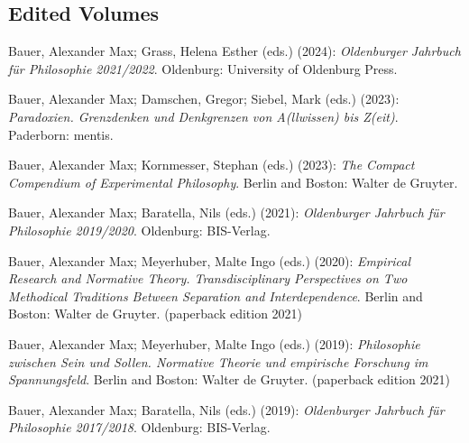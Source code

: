 \documentclass[a4paper,10pt]{article}
\newenvironment{literature}{%
   \parskip6pt\parindent0pt\raggedright
   \def\lititem{\hangindent=1cm\hangafter1}}{%
   \par\ignorespaces}
\begin{document}
\subsection*{Edited Volumes}
\begin{literature}
\lititem Bauer, Alexander Max; Grass, Helena Esther (eds.) (2024): \textit{Oldenburger Jahrbuch für Philosophie 2021/2022}. Oldenburg: University of Oldenburg Press.

\lititem Bauer, Alexander Max; Damschen, Gregor; Siebel, Mark (eds.) (2023): \textit{Paradoxien. Grenzdenken und Denkgrenzen von A(llwissen) bis Z(eit)}. Paderborn: mentis.

\lititem Bauer, Alexander Max; Kornmesser, Stephan (eds.) (2023): \textit{The Compact Compendium of Experimental Philosophy}. Berlin and Boston: Walter de Gruyter.

\lititem Bauer, Alexander Max; Baratella, Nils (eds.) (2021): \textit{Oldenburger Jahrbuch für Philosophie 2019/2020}. Oldenburg: BIS-Verlag.

\lititem Bauer, Alexander Max; Meyerhuber, Malte Ingo (eds.) (2020): \textit{Empirical Research and Normative Theory. Transdisciplinary Perspectives on Two Methodical Traditions Between Separation and Interdependence}. Berlin and Boston: Walter de Gruyter. (paperback edition 2021)

\lititem Bauer, Alexander Max; Meyerhuber, Malte Ingo (eds.) (2019): \textit{Philosophie zwischen Sein und Sollen. Normative Theorie und empirische Forschung im Spannungsfeld}. Berlin and Boston: Walter de Gruyter. (paperback edition 2021)

\lititem Bauer, Alexander Max; Baratella, Nils (eds.) (2019): \textit{Oldenburger Jahrbuch für Philosophie 2017/2018}. Oldenburg: BIS-Verlag.
\end{literature}


\end{document}
